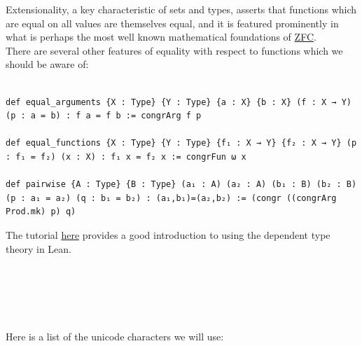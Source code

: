 \documentclass{book}
\theoremstyle{definition}
\newcounter{pcounter}
\newcounter{lcounter}
\newcounter{sectioncount}
\newcounter{subsectioncount}
\renewcommand{\section}[1]{\newpage\ \\ \ \\ \begin{center} \scalebox{1.5}{\texttt{\thesectioncount . #1}} \stepcounter{sectioncount} \setcounter{subsectioncount}{1} \end{center} \begin{center} \ \\ \ \\ \thispagestyle{empty} \end{center}}
\begin{document}
Extensionality, a key characteristic of sets and types, asserts that functions which are equal on all values are themselves equal, and it is featured prominently in what is perhaps the most well known mathematical foundations of \href{https://encyclopediaofmath.org/wiki/ZFC}{ZFC}.\\

There are several other features of equality with respect to functions which we should be aware of:

\begin{center}
\begin{tcolorbox}[width=5in,colback={white},title={\begin{center}\texttt{Lean \thelcounter} \addtocounter{lcounter}{1}  \end{center}},colbacktitle=Blue,coltitle=black]
\begin{verbatim}

def equal_arguments {X : Type} {Y : Type} {a : X} {b : X} (f : X → Y) (p : a = b) : f a = f b := congrArg f p

def equal_functions {X : Type} {Y : Type} {f₁ : X → Y} {f₂ : X → Y} (p : f₁ = f₂) (x : X) : f₁ x = f₂ x := congrFun ω x

def pairwise {A : Type} {B : Type} (a₁ : A) (a₂ : A) (b₁ : B) (b₂ : B) (p : a₁ = a₂) (q : b₁ = b₂) : (a₁,b₁)=(a₂,b₂) := (congr ((congrArg Prod.mk) p) q)

\end{verbatim}
\end{tcolorbox}
\end{center}

The tutorial \href{https://leanprover.github.io/theorem_proving_in_lean4/}{here} provides a good introduction to using the dependent type theory in Lean.\\



\newpage
\section{Unicode}

Here is a list of the unicode characters we will use:
\end{document}

